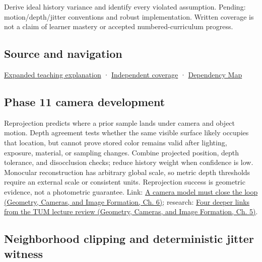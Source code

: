 Derive ideal history variance and identify every violated assumption. Pending: motion/depth/jitter conventions and robust implementation. Written coverage is not a claim of learner mastery or accepted numbered-curriculum progress.

\subsection{Source and navigation}\label{appendix-0727340a4428-source-and-navigation}

\hyperref[04-visual-computing-ii-ch042-temporal-reconstruction-is-an-inference-about-correspondence]{Expanded teaching explanation} · \hyperref[appendix-fd090d982a15-xr01---independent-seeing-and-representation-source]{Independent coverage} · \hyperref[appendix-4ad47bdd269a]{Dependency Map}

\subsection{Phase 11 camera development}\label{appendix-0727340a4428-phase-11-camera-development}

Reprojection predicts where a prior sample lands under camera and object motion. Depth agreement tests whether the same visible surface likely occupies that location, but cannot prove stored color remains valid after lighting, exposure, material, or sampling changes. Combine projected position, depth tolerance, and disocclusion checks; reduce history weight when confidence is low. Monocular reconstruction has arbitrary global scale, so metric depth thresholds require an external scale or consistent units. Reprojection success is geometric evidence, not a photometric guarantee. Link: \href{../03-Geometry-Cameras-and-Image-Formation/main.pdf\#nameddest=02-foundations-ii-ch037-a-camera-model-must-close-the-loop}{A camera model must close the loop (Geometry, Cameras, and Image Formation, Ch. 6)}; research: \href{../03-Geometry-Cameras-and-Image-Formation/main.pdf\#nameddest=02-foundations-ii-ch036-four-deeper-links-from-the-tum-lecture-review}{Four deeper links from the TUM lecture review (Geometry, Cameras, and Image Formation, Ch. 5)}.

\subsection{Neighborhood clipping and deterministic jitter witness}\label{appendix-0727340a4428-neighborhood-clipping-and-deterministic-jitter-witness}

